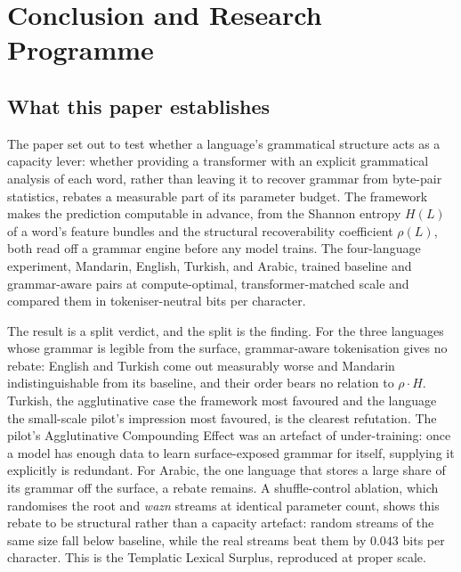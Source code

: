 \section{Conclusion and Research Programme}
\label{sec:conclusion}

\subsection{What this paper establishes}
\label{sec:conclusion-established}

The paper set out to test whether a language's grammatical structure acts as a capacity lever: whether providing a transformer with an explicit grammatical analysis of each word, rather than leaving it to recover grammar from byte-pair statistics, rebates a measurable part of its parameter budget. The framework makes the prediction computable in advance, from the Shannon entropy $H(L)$ of a word's feature bundles and the structural recoverability coefficient $\rho(L)$, both read off a grammar engine before any model trains. The four-language experiment, Mandarin, English, Turkish, and Arabic, trained baseline and grammar-aware pairs at compute-optimal, transformer-matched scale and compared them in tokeniser-neutral bits per character.

The result is a split verdict, and the split is the finding. For the three languages whose grammar is legible from the surface, grammar-aware tokenisation gives no rebate: English and Turkish come out measurably worse and Mandarin indistinguishable from its baseline, and their order bears no relation to $\rho \cdot H$. Turkish, the agglutinative case the framework most favoured and the language the small-scale pilot's impression most favoured, is the clearest refutation. The pilot's Agglutinative Compounding Effect was an artefact of under-training: once a model has enough data to learn surface-exposed grammar for itself, supplying it explicitly is redundant. For Arabic, the one language that stores a large share of its grammar off the surface, a rebate remains. A shuffle-control ablation, which randomises the root and \emph{wazn} streams at identical parameter count, shows this rebate to be structural rather than a capacity artefact: random streams of the same size fall below baseline, while the real streams beat them by $0.043$ bits per character. This is the Templatic Lexical Surplus, reproduced at proper scale.

